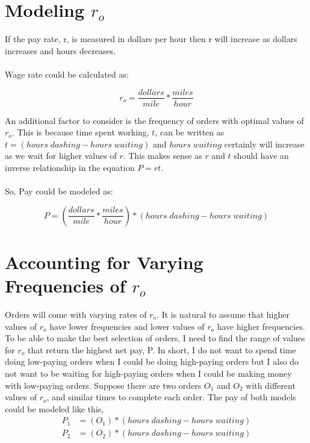 \documentclass{article}
\begin{document}
\section*{Modeling $r_o$}
If the pay rate, r, is measured in dollars per hour then r will increase as dollars increases and hours decreases. 
\\
\\
\noindent Wage rate could be calculated as:

	$$r_o= \frac{dollars}{mile}* \frac{miles}{hour}$$
	
\noindent An additional factor to consider is the frequency of orders with optimal values of $r_o$. This is because time spent working, $t$, can be written as \\ 
$t=(hours\;dashing - hours\;waiting)$ and $hours\;waiting$ certainly will increase as we wait for higher values of $r$. This makes sense as $r$ and $t$ should have an inverse relationship in the equation $P=rt$. \\
\\
\noindent So, Pay could be modeled as:

$$P=\left(\frac{dollars}{mile}*\frac{miles}{hour}\right)*(hours\;dashing - hours\;waiting)$$

\section*{Accounting for Varying Frequencies of $r_o$}

Orders will come with varying rates of  $r_o$. It is natural to assume that higher values of  $r_o$  have lower frequencies and lower values of  $r_o$  have higher frequencies. To be able to make the best selection of orders, I need to find the range of values for  $r_o$  that return the highest net pay, P. In short, I do not want to spend time doing low-paying orders when I could be doing high-paying orders but I also do not want to be waiting for high-paying orders when I could be making money with low-paying orders.
\newline
\newline
\noindent Suppose there are two orders $O_1$ and $O_2$ with different values of $r_o$, and similar times to complete each order.  The pay of both models could be modeled like this, 
\newline \newline
\begin{align*}
    P_1&=(O_1)*(hours\;dashing - hours\;waiting) \\
    P_2&=(O_2)*(hours\;dashing - hours\;waiting)
\end{align*}
\end{document}
